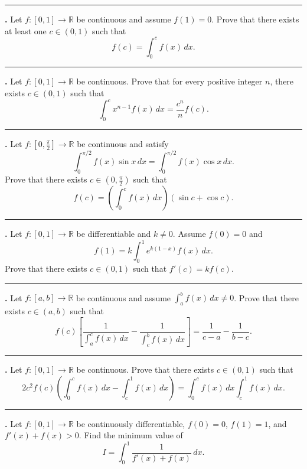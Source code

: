 \documentclass[11pt]{article}
\newcounter{probnum}
\newenvironment{problembox}{\par\noindent\rule{\linewidth}{0.5pt}\vspace{5pt}\par}{\vspace{2pt}}
\begin{document}
\begin{problembox}
\textbf{\theprobnum.} Let $f : [0,1] \to \mathbb{R}$ be continuous and assume $f(1)=0$. Prove that there exists at least one $c \in (0,1)$ such that
\[
f(c) = \int_0^c f(x)\,dx.
\]
\end{problembox}

\begin{problembox}
\textbf{\theprobnum.} Let $f : [0,1] \to \mathbb{R}$ be continuous. Prove that for every positive integer $n$, there exists $c \in (0,1)$ such that
\[
\int_0^c x^{n-1} f(x)\,dx = \frac{c^n}{n} f(c).
\]
\end{problembox}

\begin{problembox}
\textbf{\theprobnum.} Let $f : [0,\tfrac{\pi}{2}] \to \mathbb{R}$ be continuous and satisfy
\[
\int_0^{\pi/2} f(x) \sin x\,dx = \int_0^{\pi/2} f(x) \cos x\,dx.
\]
Prove that there exists $c \in (0,\tfrac{\pi}{2})$ such that
\[
f(c) = \left(\int_0^c f(x)\,dx\right)(\sin c + \cos c).
\]
\end{problembox}

\begin{problembox}
\textbf{\theprobnum.} Let $f : [0,1] \to \mathbb{R}$ be differentiable and $k \ne 0$. Assume $f(0)=0$ and
\[
f(1) = k \int_0^1 e^{k(1-x)} f(x)\,dx.
\]
Prove that there exists $c \in (0,1)$ such that $f'(c) = k f(c)$.
\end{problembox}

\begin{problembox}
\textbf{\theprobnum.} Let $f : [a,b] \to \mathbb{R}$ be continuous and assume $\displaystyle\int_a^b f(x)\,dx \ne 0$. Prove that there exists $c \in (a,b)$ such that
\[
f(c) \left[\frac{1}{\int_a^c f(x)\,dx} - \frac{1}{\int_c^b f(x)\,dx}\right] = \frac{1}{c-a} - \frac{1}{b-c}.
\]
\end{problembox}

\begin{problembox}
\textbf{\theprobnum.} Let $f : [0,1] \to \mathbb{R}$ be continuous. Prove that there exists $c \in (0,1)$ such that
\[
2c^2 f(c) \left(\int_0^c f(x)\,dx - \int_c^1 f(x)\,dx\right) = \int_0^c f(x)\,dx \int_c^1 f(x)\,dx.
\]
\end{problembox}

\begin{problembox}
\textbf{\theprobnum.} Let $f : [0,1] \to \mathbb{R}$ be continuously differentiable, $f(0)=0$, $f(1)=1$, and $f'(x)+f(x) > 0$. Find the minimum value of
\[
I = \int_0^1 \frac{1}{f'(x)+f(x)}\,dx.
\]
\end{problembox}
\end{document}
